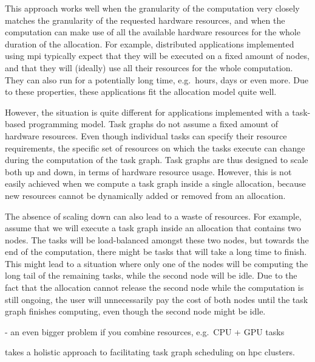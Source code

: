 
This approach works well when the granularity of the computation very closely matches the
granularity of the requested hardware resources, and when the computation can make use of all the
available hardware resources for the whole duration of the allocation. For example, distributed
applications implemented using \gls{mpi} typically expect that they will be executed
on a fixed amount of nodes, and that they will (ideally) use all their resources for the whole
computation. They can also run for a potentially long time, e.g.\ hours, days or even more. Due to
these properties, these applications fit the allocation model quite well.

However, the situation is quite different for applications implemented with a task-based
programming model. Task graphs do not assume a fixed amount of hardware resources. Even though
individual tasks can specify their resource requirements, the specific set of resources on which
the tasks execute can change during the computation of the task graph. Task graphs are thus
designed to scale both up and down, in terms of hardware resource usage. However, this is not
easily achieved when we compute a task graph inside a single allocation, because new resources
cannot be dynamically added or removed from an allocation.

The absence of scaling down can also lead to a waste of resources. For example, assume that we will
execute a task graph inside an allocation that contains two nodes. The tasks will be load-balanced
amongst these two nodes, but towards the end of the computation, there might be tasks that will
take a long time to finish. This might lead to a situation where only one of the nodes will be
computing the long tail of the remaining tasks, while the second node will be idle. Due to the fact
that the allocation cannot release the second node while the computation is still ongoing, the user
will unnecessarily pay the cost of both nodes until the task graph finishes computing, even though
the second node might be idle.

- an even bigger problem if you combine resources, e.g.\ CPU + GPU tasks





\hyperqueue{} takes a holistic approach to facilitating task graph scheduling on
\gls{hpc} clusters.




